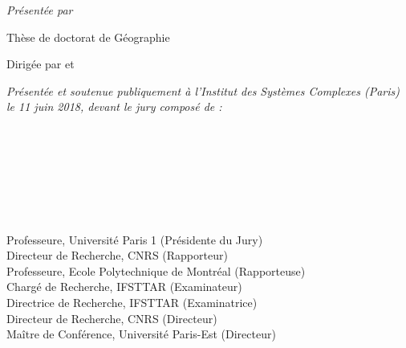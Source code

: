 \begin{titlepage}
\begin{addmargin}[-1cm]{-3cm}
\begin{center}

\textit{Présentée par} \spacedlowsmallcaps{\myName}\\ %
\bigskip

Thèse de doctorat de Géographie


Dirigée par \myProf et \myOtherProf \\ \medskip





\vspace{0.5cm}

\textit{Présentée et soutenue publiquement à l'Institut des Systèmes Complexes (Paris) le 11 juin 2018, devant le jury composé de :}

\bigskip


\begin{adjustwidth*}{-0.5cm}{-2cm}
\begin{minipage}{0.28\linewidth}
\raggedright
\textbf{}\\
\textbf{}\\
\textbf{}\\
\textbf{}\\
\textbf{}\\
\textbf{}\\
\textbf{}
\end{minipage}
\begin{minipage}{0.7\linewidth}
\raggedright
Professeure, Université Paris 1 (Présidente du Jury)\\
Directeur de Recherche, CNRS (Rapporteur)\\
Professeure, Ecole Polytechnique de Montréal (Rapporteuse)\\
Chargé de Recherche, IFSTTAR (Examinateur)\\
Directrice de Recherche, IFSTTAR (Examinatrice)\\
Directeur de Recherche, CNRS (Directeur)\\
Maître de Conférence, Université Paris-Est (Directeur)\\
\end{minipage}
\end{adjustwidth*}


\end{center}
\end{addmargin}
\end{titlepage}
